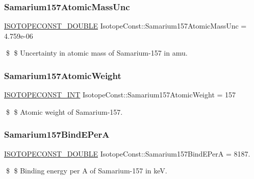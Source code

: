 \subsubsection{\texorpdfstring{Samarium157\+Atomic\+Mass\+Unc}{Samarium157AtomicMassUnc}}
{\footnotesize\ttfamily \mbox{\hyperlink{group___isotope_const-_macros_ga8f45a7272ce02c0b4c65c44636ed719a}{I\+S\+O\+T\+O\+P\+E\+C\+O\+N\+S\+T\+\_\+\+D\+O\+U\+B\+LE}} Isotope\+Const\+::\+Samarium157\+Atomic\+Mass\+Unc = 4.\+759e-\/06}

\$ \$ Uncertainty in atomic mass of Samarium-\/157 in amu. \mbox{\label{group___isotope_const-_samarium-_sm157_gab70cb9ecb9ad62efec9f7c77de754778}} 
\subsubsection{\texorpdfstring{Samarium157\+Atomic\+Weight}{Samarium157AtomicWeight}}
{\footnotesize\ttfamily \mbox{\hyperlink{group___isotope_const-_macros_ga5f18360b3e99483a35c32d789e62621c}{I\+S\+O\+T\+O\+P\+E\+C\+O\+N\+S\+T\+\_\+\+I\+NT}} Isotope\+Const\+::\+Samarium157\+Atomic\+Weight = 157}

\$ \$ Atomic weight of Samarium-\/157. \mbox{\label{group___isotope_const-_samarium-_sm157_ga40bf9ec4aa24276c632ea70b331dbd27}} 
\subsubsection{\texorpdfstring{Samarium157\+Bind\+E\+PerA}{Samarium157BindEPerA}}
{\footnotesize\ttfamily \mbox{\hyperlink{group___isotope_const-_macros_ga8f45a7272ce02c0b4c65c44636ed719a}{I\+S\+O\+T\+O\+P\+E\+C\+O\+N\+S\+T\+\_\+\+D\+O\+U\+B\+LE}} Isotope\+Const\+::\+Samarium157\+Bind\+E\+PerA = 8187.}

\$ \$ Binding energy per A of Samarium-\/157 in keV. \mbox{\label{group___isotope_const-_samarium-_sm157_ga2c7eb089661af872eeb7f6bf1487fa6f}} 
